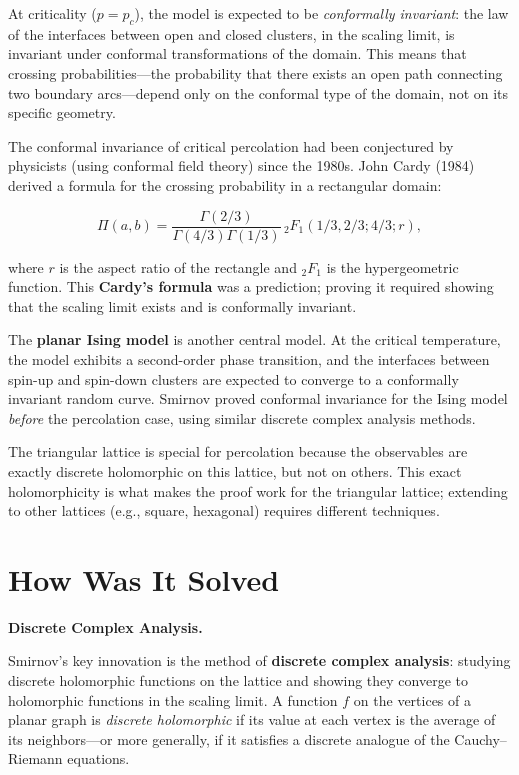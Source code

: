 At criticality ($p = p_c$), the model is expected to be \emph{conformally invariant}: the law of the interfaces between open and closed clusters, in the scaling limit, is invariant under conformal transformations of the domain. This means that crossing probabilities---the probability that there exists an open path connecting two boundary arcs---depend only on the conformal type of the domain, not on its specific geometry.

The conformal invariance of critical percolation had been conjectured by physicists (using conformal field theory) since the 1980s. John Cardy (1984) derived a formula for the crossing probability in a rectangular domain:

\[
\Pi(a,b) = \frac{\Gamma(2/3)}{\Gamma(4/3)\Gamma(1/3)} \, {}_2F_1(1/3, 2/3; 4/3; r),
\]

where $r$ is the aspect ratio of the rectangle and ${}_2F_1$ is the hypergeometric function. This \textbf{Cardy's formula} was a prediction; proving it required showing that the scaling limit exists and is conformally invariant.

The \textbf{planar Ising model} is another central model. At the critical temperature, the model exhibits a second-order phase transition, and the interfaces between spin-up and spin-down clusters are expected to converge to a conformally invariant random curve. Smirnov proved conformal invariance for the Ising model \emph{before} the percolation case, using similar discrete complex analysis methods.

The triangular lattice is special for percolation because the observables are exactly discrete holomorphic on this lattice, but not on others. This exact holomorphicity is what makes the proof work for the triangular lattice; extending to other lattices (e.g., square, hexagonal) requires different techniques.

\section{How Was It Solved}\label{ch2010stanislavsmirnov:how-was-it-solved}

\textbf{Discrete Complex Analysis.}

Smirnov's key innovation is the method of \textbf{discrete complex analysis}: studying discrete holomorphic functions on the lattice and showing they converge to holomorphic functions in the scaling limit. A function $f$ on the vertices of a planar graph is \emph{discrete holomorphic} if its value at each vertex is the average of its neighbors---or more generally, if it satisfies a discrete analogue of the Cauchy--Riemann equations.

